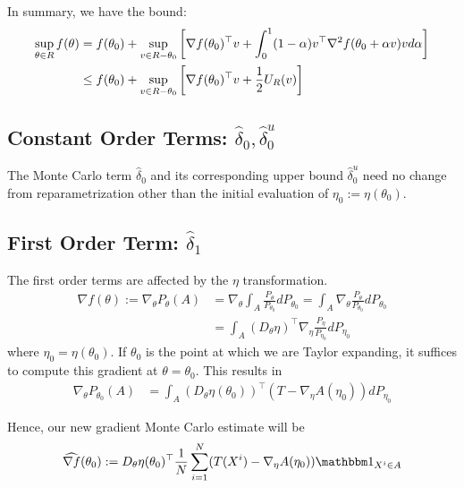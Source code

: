 \documentclass[10pt]{article}
\begin{document}
In summary, we have the bound:
\begin{align*}
    \sup\limits_{\theta \in R}
    f(\theta)
    &=
    f(\theta_0)
    +
    \sup\limits_{v \in R-\theta_0}
    \bracket{%
        \nabla f(\theta_0)^\top v
        +
        \int_0^1 (1-\alpha)
        v^\top \nabla^2 f(\theta_0 + \alpha v) v 
        d\alpha
    }
    \\&\leq
    f(\theta_0)
    +
    \sup\limits_{v \in R-\theta_0}
    \bracket{%
        \nabla f(\theta_0)^\top v
        +
        \frac{1}{2} U_R(v)
    }
\end{align*}

\subsection{Constant Order Terms: $\hat{\delta}_0, \hat{\delta}_0^u$}

The Monte Carlo term $\hat{\delta}_0$ and its corresponding upper bound
$\hat{\delta}_0^u$ need no change from reparametrization
other than the initial evaluation of $\eta_0 := \eta(\theta_0)$.

\subsection{First Order Term: $\hat{\delta}_1$}

The first order terms are affected by the $\eta$ transformation.
\begin{align*}
    \nabla f(\theta)
    :=
    \nabla_{\theta} P_\theta(A) 
    &=
    \nabla_{\theta} \int_A \frac{P_{\theta}}{P_{\theta_0}} dP_{\theta_0}
    =
    \int_A \nabla_{\theta} \frac{P_{\theta}}{P_{\theta_0}} dP_{\theta_0}
    \\&=
    \int_A (D_{\theta}\eta)^\top 
    \nabla_{\eta} \frac{P_{\eta}}{P_{\eta_0}} dP_{\eta_0}
\end{align*}
where $\eta_0 = \eta(\theta_0)$.
If $\theta_0$ is the point at which we are Taylor expanding,
it suffices to compute this gradient at $\theta = \theta_0$.
This results in
\begin{align*}
    \nabla_{\theta} P_{\theta_0}(A) 
    &=
    \int_A (D_{\theta}\eta(\theta_0))^\top (T - \nabla_\eta A(\eta_0)) dP_{\eta_0}
\end{align*}

Hence, our new gradient Monte Carlo estimate will be
\begin{align*}
    \widehat{\nabla f}(\theta_0)
    :=
    D_{\theta} \eta(\theta_0)^\top 
    \frac{1}{N}
    \sum\limits_{i=1}^N
    (T(X^i)-\nabla_\eta A(\eta_0)) \indic{X^i \in A}
\end{align*}
\end{document}
